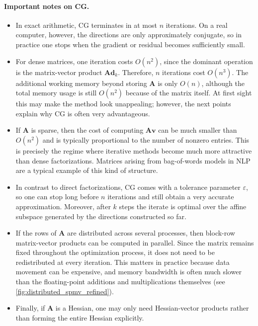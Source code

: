 \paragraph{Important notes on CG.}
\begin{itemize}
  \item In exact arithmetic, CG terminates in at most $n$ iterations. On a real
  computer, however, the directions are only approximately conjugate, so in
  practice one stops when the gradient or residual becomes sufficiently small.
  \item For dense matrices, one iteration costs $O(n^2)$, since the dominant
  operation is the matrix-vector product $\mathbf{A}\mathbf{d}_k$. Therefore,
  $n$ iterations cost $O(n^3)$. The additional working memory beyond storing
  $\mathbf{A}$ is only $O(n)$, although the total memory usage is still
  $O(n^2)$ because of the matrix itself. At first sight this may make the
  method look unappealing; however, the next points explain why CG is often
  very advantageous.
  \item If $\mathbf{A}$ is sparse, then the cost of computing
  $\mathbf{A}\mathbf{v}$ can be much smaller than $O(n^2)$ and is typically
  proportional to the number of nonzero entries. This is precisely the regime
  where iterative methods become much more attractive than dense factorizations.
  Matrices arising from bag-of-words models in NLP are a typical example of
  this kind of structure.
  \item In contrast to direct factorizations, CG comes with a tolerance
  parameter $\varepsilon$, so one can stop long before $n$ iterations and still
  obtain a very accurate approximation. Moreover, after $k$ steps the iterate
  is optimal over the affine subspace generated by the directions constructed so
  far.
  \item If the rows of $\mathbf{A}$ are distributed across several processes, then
  block-row matrix-vector products can be computed in parallel. Since the matrix
  remains fixed throughout the optimization process, it does not need to be
  redistributed at every iteration. This matters in practice because data
  movement can be expensive, and memory bandwidth is often much slower than the
  floating-point additions and multiplications themselves (see
  \cref{fig:distributed_spmv_refined}).
  \item Finally, if $\mathbf{A}$ is a Hessian, one may only need
  Hessian-vector products rather than forming the entire Hessian explicitly.
\end{itemize}

